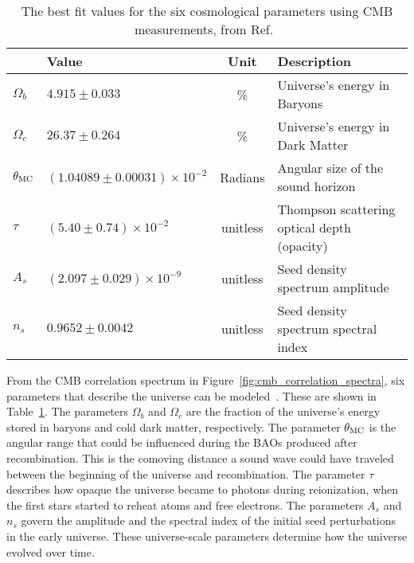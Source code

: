 \begin{table}[t]
  \centering
  \begin{tabular}{llcl}
               & \textbf{Value}                 & \textbf{Unit} & \textbf{Description} \\
    \hline 
    $\Omega_b$ & $ 4.915  \pm0.033                 $ & \%       & Universe's energy in Baryons \\
    $\Omega_c$ & $ 26.37  \pm0.264                 $ & \%       & Universe's energy in Dark Matter \\
    $\theta_{\textrm{MC}}$ & $(1.04089\pm0.00031)\times 10^{-2}$ & Radians  & Angular size of the sound horizon \\
    $\tau$     & $(5.40   \pm0.74   )\times 10^{-2}$ & unitless & Thompson scattering optical depth (opacity)\\
    $A_s$      & $(2.097  \pm0.029  )\times 10^{-9}$ & unitless & Seed density spectrum amplitude \\
    $n_s$      & $ 0.9652 \pm0.0042                $ & unitless & Seed density spectrum spectral index \\
    \hline 
  \end{tabular}
  \caption[6 Cosmological Parameters]{
    The best fit values for the six cosmological parameters using CMB measurements, from Ref.~\cite{planck_dm_limit}}
  \label{tab:six_params}
\end{table}

From the CMB correlation spectrum in Figure~\ref{fig:cmb_correlation_spectra}, six parameters that describe the universe can be modeled~\cite{planck_dm_limit,planck_2013_parameters}.
These are shown in Table~\ref{tab:six_params}.
The parameters $\Omega_b$ and $\Omega_c$ are the fraction of the universe's energy stored in baryons and cold dark matter, respectively.
The parameter $\theta_{\textrm{MC}}$ is the angular range that could be influenced during the BAOs produced after recombination.
This is the comoving distance a sound wave could have traveled between the beginning of the universe and recombination.
The parameter $\tau$ describes how opaque the universe became to photons during reionization, when the first stars started to reheat atoms and free electrons.
The parameters $A_s$ and $n_s$ govern the amplitude and the spectral index of the initial seed perturbations in the early universe.
These universe-scale parameters determine how the universe evolved over time.

